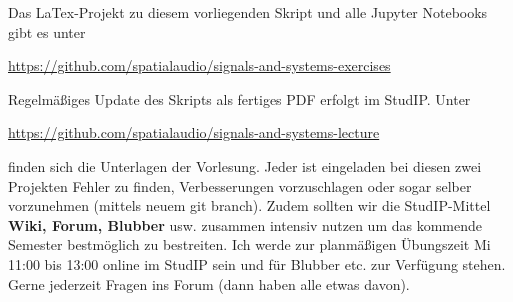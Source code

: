 Das LaTex-Projekt zu diesem vorliegenden Skript und alle Jupyter Notebooks
gibt es unter
\begin{mdframed}[backgroundcolor=C2!10]
\url{https://github.com/spatialaudio/signals-and-systems-exercises}
\end{mdframed}
%
Regelmäßiges Update des Skripts als fertiges PDF erfolgt im StudIP.
%
Unter
\begin{mdframed}[backgroundcolor=C2!10]
\url{https://github.com/spatialaudio/signals-and-systems-lecture}
\end{mdframed}
finden sich die Unterlagen der Vorlesung.
%
Jeder ist eingeladen bei diesen zwei Projekten Fehler zu finden, Verbesserungen
vorzuschlagen oder sogar selber vorzunehmen (mittels neuem git branch).
%
Zudem sollten wir die StudIP-Mittel \textbf{Wiki, Forum, Blubber} usw. zusammen
intensiv nutzen um das kommende Semester bestmöglich zu bestreiten.
%
Ich werde zur planmäßigen Übungszeit Mi 11:00 bis 13:00 online im StudIP sein
und für Blubber etc. zur Verfügung stehen.
%
Gerne jederzeit Fragen ins Forum (dann haben alle etwas davon).

\newpage

